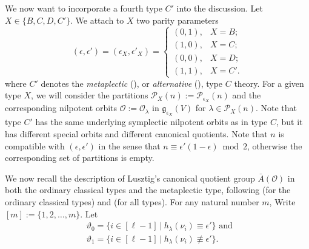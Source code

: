 \documentclass{amsart}
\theoremstyle{definition}
\newcommand{\cP}{\mathcal{P}}
\newcommand{\g}{\mathfrak{g}}
\newcommand{\Ab}{\bar{A}}
\newcommand{\0}{\mathcal{O}}
\begin{document}
We now want to incorporate a fourth type $C'$ into the discussion. Let $X\in\{B,C,D,C'\}$. We attach to $X$ two parity parameters
\[
(\epsilon,\epsilon')=(\epsilon_X,\epsilon'_X)=
\begin{cases}
(0,1), & X=B;\\
(1,0), & X=C;\\
(0,0), & X=D;\\
(1,1), & X=C'.
\end{cases}
\]
where $C'$ denotes the {\it metaplectic} (\cite{BMSZ-metaplectic}), or {\it alternative} (\cite{JLS:Duality}), type $C$ theory. For a given type $X$, we will consider the partitions $\cP_X(n) := \cP_{\epsilon_X}(n)$ and the corresponding nilpotent orbits $\0 := \0_{\lambda}$ in $\g_{\epsilon_X}(V)$ for $\lambda \in \cP_X(n)$.
Note that type $C'$ has the same underlying symplectic nilpotent orbits as in type $C$, but it has different special orbits and different canonical quotients.
Note that $n$ is compatible with $(\epsilon,\epsilon')$
in the sense that $n \equiv \epsilon'(1-\epsilon) \bmod{2}$, otherwise the corresponding set of partitions is empty.


We now recall the description of Lusztig's canonical quotient group $\Ab(\0)$ in both the ordinary classical types and the metaplectic type, following
\cite[Section 5]{Sommers:Duality} (for the ordinary classical types) and \cite[Section 6.2]{JLS:Duality} (for all types).
For any natural number $m$, Write $[m]:= \{1, 2, \dots, m\}$.
Let 
\begin{align} \label{equation:vartheta}
&\vartheta_0 = \{ i \in [\ell-1] \ | \ h_\lambda(\nu_i) \equiv \epsilon'\}  \text{ and } \\
&\vartheta_1 = \{i \in [\ell-1] \ | \ h_\lambda(\nu_i) \not\equiv \epsilon'\}.
\nonumber
\end{align}
\end{document}
